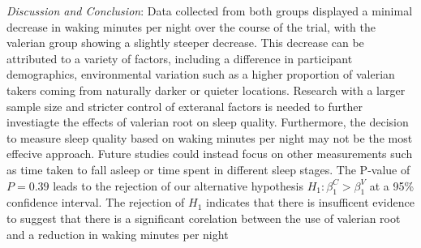 \documentclass[10pt,preprintnumbers,amsmath,amssymb,floatfix,twocolumn,prl]{revtex4-2}
\begin{document}
\textit{Discussion and Conclusion}: Data collected from both groups displayed a minimal decrease in waking minutes per night over the course of the trial, with the valerian group showing a slightly steeper decrease. This decrease can be attributed to a variety of factors, including a difference in participant demographics, environmental variation such as a higher proportion of valerian takers coming from naturally darker or quieter locations. 
Research with a larger sample size and stricter control of exteranal factors is needed to further investiagte the effects of valerian root on sleep quality. Furthermore, the decision to measure sleep quality based on waking minutes per night may not be the most effecive approach. Future studies could instead focus on other measurements such as time taken to fall asleep or time spent in different sleep stages.
The P-value of $P = 0.39$ leads to the rejection of our alternative hypothesis $H_1: \beta_1^C > \beta_1^V$ at a 95\% confidence interval. The rejection of $H_1$ indicates that there is insufficent evidence to suggest that there is a significant corelation between the use of valerian root and a reduction in waking minutes per night





\end{document}
